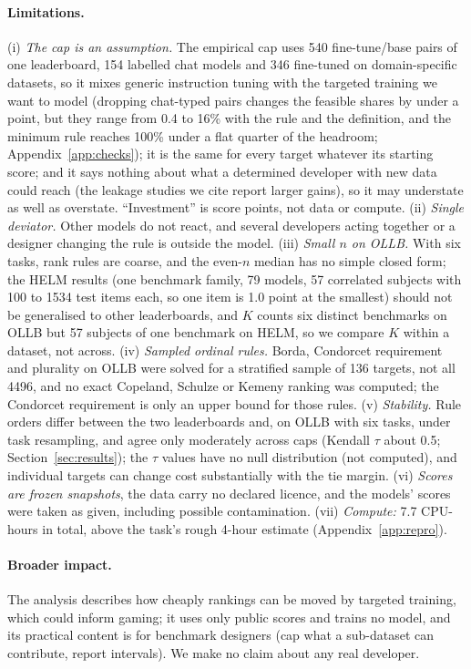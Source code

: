 \paragraph{Limitations.}
(i) \emph{The cap is an assumption.} The empirical cap uses 540 fine-tune/base pairs of one leaderboard, 154 labelled chat models and 346 fine-tuned on domain-specific datasets, so it mixes generic instruction tuning with the targeted training we want to model (dropping chat-typed pairs changes the feasible shares by under a point, but they range from 0.4 to 16\% with the rule and the definition, and the minimum rule reaches 100\% under a flat quarter of the headroom; Appendix~\ref{app:checks}); it is the same for every target whatever its starting score; and it says nothing about what a determined developer with new data could reach (the leakage studies we cite report larger gains), so it may understate as well as overstate. ``Investment'' is score points, not data or compute. (ii) \emph{Single deviator.} Other models do not react, and several developers acting together or a designer changing the rule is outside the model. (iii) \emph{Small $n$ on OLLB.} With six tasks, rank rules are coarse, and the even-$n$ median has no simple closed form; the HELM results (one benchmark family, 79 models, 57 correlated subjects with 100 to 1534 test items each, so one item is 1.0 point at the smallest) should not be generalised to other leaderboards, and $K$ counts six distinct benchmarks on OLLB but 57 subjects of one benchmark on HELM, so we compare $K$ within a dataset, not across. (iv) \emph{Sampled ordinal rules.} Borda, Condorcet requirement and plurality on OLLB were solved for a stratified sample of 136 targets, not all 4496, and no exact Copeland, Schulze or Kemeny ranking was computed; the Condorcet requirement is only an upper bound for those rules. (v) \emph{Stability.} Rule orders differ between the two leaderboards and, on OLLB with six tasks, under task resampling, and agree only moderately across caps (Kendall $\tau$ about 0.5; Section~\ref{sec:results}); the $\tau$ values have no null distribution (not computed), and individual targets can change cost substantially with the tie margin. (vi) \emph{Scores are frozen snapshots}, the data carry no declared licence, and the models' scores were taken as given, including possible contamination. (vii) \emph{Compute:} 7.7 CPU-hours in total, above the task's rough 4-hour estimate (Appendix~\ref{app:repro}).

\paragraph{Broader impact.}
The analysis describes how cheaply rankings can be moved by targeted training, which could inform gaming; it uses only public scores and trains no model, and its practical content is for benchmark designers (cap what a sub-dataset can contribute, report intervals). We make no claim about any real developer.

